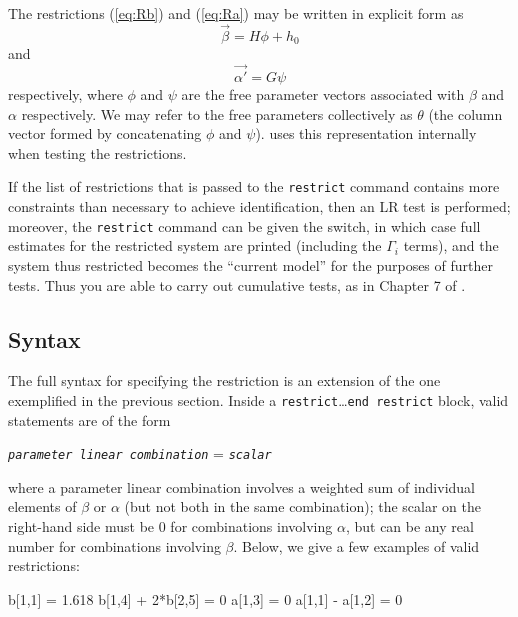 The restrictions (\ref{eq:Rb}) and (\ref{eq:Ra}) may be written in
explicit form as
\begin{equation}
\label{eq:vecbeta}
\vec{\beta} = H\phi + h_0
\end{equation}
and
\begin{equation}
\label{eq:vecalpha}
\vec{\alpha'} = G\psi
\end{equation}
respectively, where $\phi$ and $\psi$ are the free parameter vectors
associated with $\beta$ and $\alpha$ respectively.  We may refer
to the free parameters collectively as $\theta$ (the column vector
formed by concatenating $\phi$ and $\psi$).   uses this
representation internally when testing the restrictions.

If the list of restrictions that is passed to the \texttt{restrict}
command contains more constraints than necessary to achieve
identification, then an LR test is performed; moreover, the
\texttt{restrict} command can be given the  switch, in
which case full estimates for the restricted system are printed
(including the $\Gamma_i$ terms), and the system thus restricted
becomes the ``current model'' for the purposes of further tests.  Thus
you are able to carry out cumulative tests, as in Chapter 7 of
\cite{johansen95}.

\subsection{Syntax}
\label{sec:vecm-restr-syntax}

The full syntax for specifying the restriction is an extension of the
one exemplified in the previous section. Inside a
\texttt{restrict}\ldots\texttt{end restrict} block, valid statements
are of the form
\begin{center}
  \texttt{\emph{parameter linear combination}} = \emph{\texttt{scalar}}
\end{center}
where a parameter linear combination involves a weighted sum of
individual elements of $\beta$ or $\alpha$ (but not both in the same
combination); the scalar on the right-hand side must be 0 for
combinations involving $\alpha$, but can be any real number for
combinations involving $\beta$. Below, we give a few examples of valid
restrictions:
\begin{code}
  b[1,1] = 1.618
  b[1,4] + 2*b[2,5] = 0
  a[1,3] = 0
  a[1,1] - a[1,2] = 0
\end{code}

